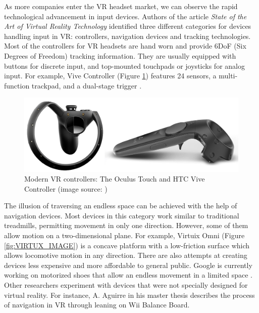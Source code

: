 As more companies enter the VR headset market, we can observe the rapid technological advancement in input devices. Authors of the article \textit{State of the Art of Virtual Reality Technology} \cite{VR_TECHNOLOGY} identified three different categories for devices handling input in VR: controllers, navigation devices and tracking technologies. Most of the controllers for VR headsets are hand worn and provide 6DoF (Six Degrees of Freedom) tracking information. They are usually equipped with buttons for discrete input, and top-mounted touchpads or joysticks for analog input. For example, Vive Controller (Figure \ref{fig:CONTROLLERS_IMAGE}) features 24 sensors, a multi-function trackpad, and a dual-stage trigger \cite{VIVE_IMAGE}.

\begin{figure}[th]
\centering
\includegraphics[width=1\textwidth]{img/modern_controllers.png}
\caption{Modern VR controllers: The Oculus Touch and HTC Vive Controller (image source: \cite{VR_TECHNOLOGY}\cite{VIVE_IMAGE})}
\label{fig:CONTROLLERS_IMAGE}
\end{figure}

The illusion of traversing an endless space can be achieved with the help of navigation devices. Most devices in this category work similar to traditional treadmills, permitting movement in only one direction. However, some of them allow motion on a two-dimensional plane. For example, Virtuix Omni (Figure \ref{fig:VIRTUX_IMAGE}) is a concave platform with a low-friction surface which allows locomotive motion in any direction. There are also attempts at creating devices less expensive and more affordable to general public. Google is currently working on motorized shoes that allow an endless movement in a limited space \cite{VR_SHOES}. Other researchers experiment with devices that were not specially designed for virtual reality. For instance, A. Aguirre in his master thesis \cite{JOYSTICK} describes the process of navigation in VR through leaning on Wii Balance Board.

